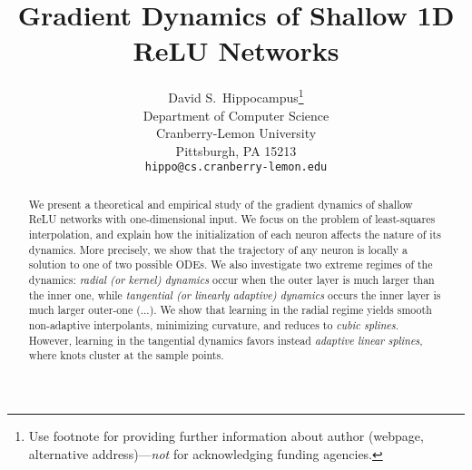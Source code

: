 \documentclass{article}
\title{Gradient Dynamics of Shallow 1D ReLU Networks}
\author{%
  David S.~Hippocampus\thanks{Use footnote for providing further information
    about author (webpage, alternative address)---\emph{not} for acknowledging
    funding agencies.} \\
  Department of Computer Science\\
  Cranberry-Lemon University\\
  Pittsburgh, PA 15213 \\
  \texttt{hippo@cs.cranberry-lemon.edu} \\
}
\newcommand{\todo}[1]{{\color{red} #1 }}
\begin{document}
\maketitle

\begin{abstract}
We present a theoretical and empirical study of the gradient dynamics of shallow ReLU networks with one-dimensional input. We focus on the problem of least-squares interpolation, and explain how the initialization of each neuron affects the nature of its dynamics. More precisely, we show that the trajectory of any neuron is locally a solution to one of two possible ODEs. We also investigate two extreme regimes of the dynamics: \emph{radial (or kernel) dynamics} occur when the outer layer is much larger than the inner one, while \emph{tangential (or linearly adaptive) dynamics} occurs the inner layer is much larger outer-one (...). We show that learning in the radial regime yields smooth non-adaptive interpolants, minimizing curvature, and reduces to \emph{cubic splines}. However, learning in the tangential dynamics favors instead \emph{adaptive linear splines}, where knots cluster at the sample points.




\end{abstract}









{}

\newpage
\appendix

\end{document}
